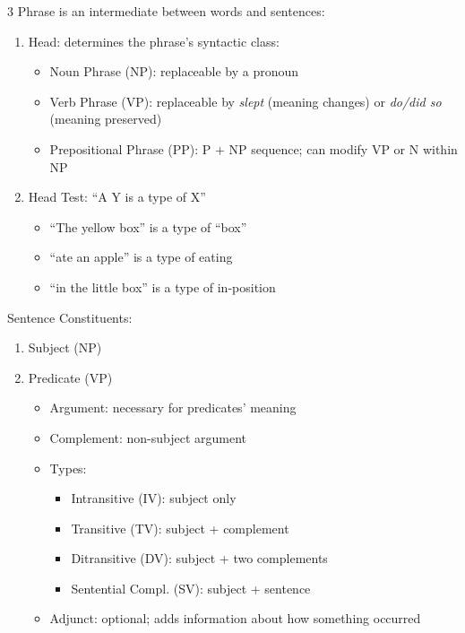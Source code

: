 \documentclass[12pt, a4paper]{article}
\begin{document}
\begin{multicols*}{3}
Phrase is an intermediate between words and sentences:
\begin{enumerate}[\roman*.]
  \item Head: determines the phrase's syntactic class:
    \begin{itemize}[leftmargin=*]\vspace{3pt}
      \item Noun Phrase (NP): replaceable by a pronoun
      \item Verb Phrase (VP): replaceable by \textit{slept} (meaning changes) or \textit{do/did so} (meaning preserved)
      \item Prepositional Phrase (PP): P $+$ NP sequence; can modify VP or N within NP
    \end{itemize}
  \item Head Test: ``A Y is a type of X''
    \begin{itemize}[leftmargin=*]\vspace{3pt}
      \item ``The yellow box'' is a type of ``box''
      \item ``ate an apple'' is a type of eating
      \item ``in the little box'' is a type of in-position
    \end{itemize}
\end{enumerate}

\colbreak
Sentence Constituents:
\begin{enumerate}[\roman*.]
  \item Subject (NP)
  \item Predicate (VP)
    \begin{itemize}[leftmargin=*]\vspace{3pt}
      \item Argument: necessary for predicates' meaning
      \item Complement: non-subject argument
      \item Types:
      \begin{itemize}[leftmargin=*]\vspace{3pt}
        \item Intransitive (IV): subject only
        \item Transitive (TV): subject + complement
        \item Ditransitive (DV): subject + two complements 
        \item Sentential Compl. (SV): subject + sentence
      \end{itemize}
    \item Adjunct: optional; adds information about how something occurred
    \end{itemize}
\end{enumerate} 


\end{multicols*}
\end{document}
